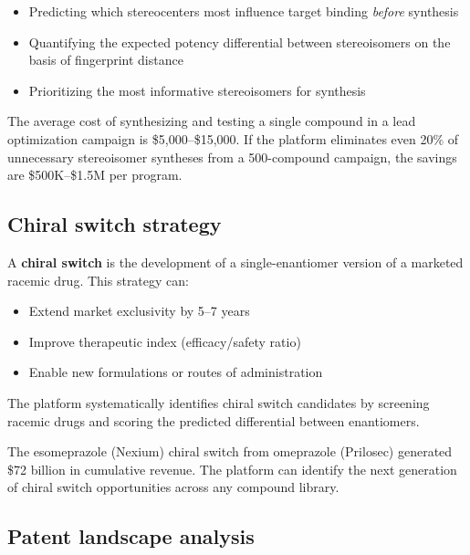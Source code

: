 \documentclass[11pt,a4paper]{article}
\begin{document}
\begin{itemize}[leftmargin=1.5em]
  \item Predicting which stereocenters most influence target binding
    \textit{before} synthesis
  \item Quantifying the expected potency differential between stereoisomers
    on the basis of fingerprint distance
  \item Prioritizing the most informative stereoisomers for synthesis
\end{itemize}

\begin{financialbox}
The average cost of synthesizing and testing a single compound in a lead
optimization campaign is \$5,000--\$15,000. If the platform eliminates even
20\% of unnecessary stereoisomer syntheses from a 500-compound campaign, the
savings are \$500K--\$1.5M per program.
\end{financialbox}

\subsection{Chiral switch strategy}

A \textbf{chiral switch} is the development of a single-enantiomer version
of a marketed racemic drug. This strategy can:

\begin{itemize}[leftmargin=1.5em]
  \item Extend market exclusivity by 5--7 years
  \item Improve therapeutic index (efficacy/safety ratio)
  \item Enable new formulations or routes of administration
\end{itemize}

The platform systematically identifies chiral switch candidates by screening
racemic drugs and scoring the predicted differential between enantiomers.

\begin{financialbox}
The esomeprazole (Nexium) chiral switch from omeprazole (Prilosec) generated
\$72 billion in cumulative revenue. The platform can identify the next
generation of chiral switch opportunities across any compound library.
\end{financialbox}

\subsection{Patent landscape analysis}
\end{document}
